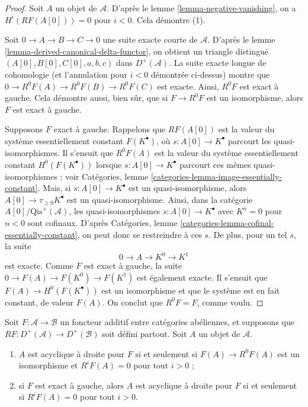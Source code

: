 \begin{proof}
Soit $A$ un objet de $\mathcal{A}$. D'après le
lemme \ref{lemma-negative-vanishing}, on a
$H^i(RF(A[0])) = 0$ pour $i < 0$. Cela démontre (1).

\medskip\noindent
Soit $0 \to A \to B \to C \to 0$ une suite exacte courte de $\mathcal{A}$.
D'après le lemme \ref{lemma-derived-canonical-delta-functor}, on obtient un
triangle distingué $(A[0], B[0], C[0], a, b, c)$ dans
$D^{+}(\mathcal{A})$. La suite exacte longue de cohomologie (et l'annulation
pour $i < 0$ démontrée ci-dessus) montre que
$0 \to R^0F(A) \to R^0F(B) \to R^0F(C)$ est exacte. Ainsi, $R^0F$ est exact à
gauche. Cela démontre aussi, bien sûr, que si $F \to R^0F$ est un
isomorphisme, alors $F$ est exact à gauche.

\medskip\noindent
Supposons $F$ exact à gauche. Rappelons que $RF(A[0])$ est la valeur du système
essentiellement constant $F(K^\bullet)$, où
$s : A[0] \to K^\bullet$ parcourt les quasi-isomorphismes. Il s'ensuit que
$R^0F(A)$ est la valeur du système essentiellement constant
$H^0(F(K^\bullet))$ lorsque $s : A[0] \to K^\bullet$ parcourt ces mêmes
quasi-isomorphismes ; voir Catégories,
lemme \ref{categories-lemma-image-essentially-constant}. Mais, si
$s : A[0] \to K^\bullet$ est un quasi-isomorphisme, alors
$A[0] \to \tau_{\geq 0}K^\bullet$ est un quasi-isomorphisme. Ainsi, dans la
catégorie $A[0]/\text{Qis}^{+}(\mathcal{A})$, les quasi-isomorphismes
$s : A[0] \to K^\bullet$ avec $K^n = 0$ pour $n < 0$ sont cofinaux. D'après
Catégories, lemme \ref{categories-lemma-cofinal-essentially-constant}, on peut
donc se restreindre à ces $s$. De plus, pour un tel $s$, la suite
$$
0 \to A \to K^0 \to K^1
$$
est exacte. Comme $F$ est exact à gauche, la suite
$0 \to F(A) \to F(K^0) \to F(K^1)$ est également exacte. Il s'ensuit que
$F(A) \to H^0(F(K^\bullet))$ est un isomorphisme et que le système est en fait
constant, de valeur $F(A)$. On conclut que $R^0F = F$, comme voulu.
\end{proof}

\begin{lemma}
\label{lemma-F-acyclic}
Soit $F : \mathcal{A} \to \mathcal{B}$ un foncteur additif entre catégories
abéliennes, et supposons que
$RF : D^{+}(\mathcal{A}) \to D^{+}(\mathcal{B})$ soit défini partout. Soit
$A$ un objet de $\mathcal{A}$.
\begin{enumerate}
\item $A$ est acyclique à droite pour $F$ si et seulement si
$F(A) \to R^0F(A)$ est un isomorphisme et $R^iF(A) = 0$ pour tout $i > 0$ ;
\item si $F$ est exact à gauche, alors $A$ est acyclique à droite pour $F$ si
et seulement si $R^iF(A) = 0$ pour tout $i > 0$.
\end{enumerate}
\end{lemma}

